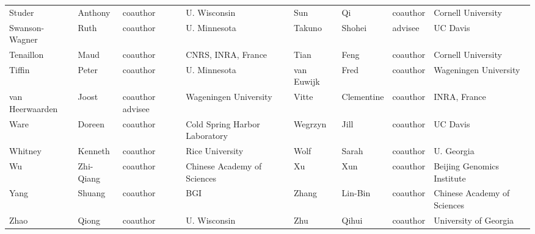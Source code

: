 \documentclass[11pt]{article}
\begin{document}
\begin{tiny}
\begin{tabular}{ l l l l l l l l }
Studer & Anthony & coauthor   & U. Wisconsin &
Sun & Qi & coauthor   & Cornell University \\ 
Swanson-Wagner & Ruth & coauthor   & U. Minnesota &
Takuno & Shohei & advisee & UC Davis \\ 
Tenaillon &  Maud & coauthor   & CNRS, INRA, France & 
Tian & Feng & coauthor   & Cornell University \\ 
Tiffin & Peter & coauthor   & U. Minnesota &
van Euwijk &  Fred & coauthor   & Wageningen University \\
van Heerwaarden &  Joost & coauthor  advisee & Wageningen University  &
Vitte & Clementine & coauthor   & INRA, France \\
Ware & Doreen & coauthor   & Cold Spring Harbor Laboratory &
Wegrzyn & Jill & coauthor   & UC Davis \\
Whitney &  Kenneth & coauthor   & Rice University &
Wolf & Sarah & coauthor   & U. Georgia \\ 
Wu &  Zhi-Qiang & coauthor   & Chinese Academy of Sciences &
Xu & Xun & coauthor   & Beijing Genomics Institute \\
Yang & Shuang & coauthor   & BGI  &
Zhang &  Lin-Bin & coauthor   & Chinese Academy of Sciences \\
Zhao & Qiong & coauthor   & U. Wisconsin &
Zhu & Qihui & coauthor   & University of Georgia \\
\hline 
\end{tabular}

\end{tiny}
\end{document}
